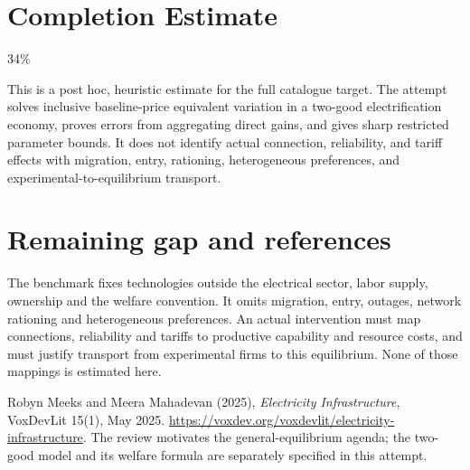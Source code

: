 \documentclass[11pt,a4paper]{article}
\theoremstyle{definition}
\theoremstyle{remark}
\begin{document}
\section{Completion Estimate}
34\%

This is a post hoc, heuristic estimate for the full catalogue target.
The attempt solves inclusive baseline-price equivalent variation in a two-good electrification economy, proves errors from aggregating direct gains, and gives sharp restricted parameter bounds. It does not identify actual connection, reliability, and tariff effects with migration, entry, rationing, heterogeneous preferences, and experimental-to-equilibrium transport.

\section{Remaining gap and references}
The benchmark fixes technologies outside the electrical sector, labor supply, ownership and the welfare convention. It omits migration, entry, outages, network rationing and heterogeneous preferences. An actual intervention must map connections, reliability and tariffs to productive capability and resource costs, and must justify transport from experimental firms to this equilibrium. None of those mappings is estimated here.

Robyn Meeks and Meera Mahadevan (2025), \emph{Electricity Infrastructure}, VoxDevLit 15(1), May 2025. \url{https://voxdev.org/voxdevlit/electricity-infrastructure}. The review motivates the general-equilibrium agenda; the two-good model and its welfare formula are separately specified in this attempt.
\end{document}
